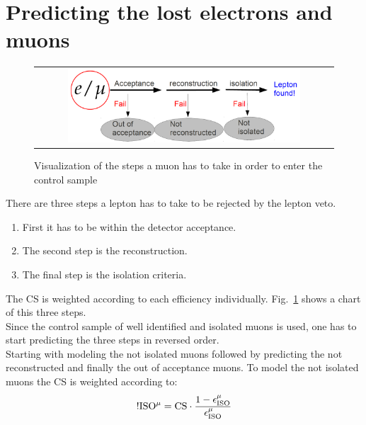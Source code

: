 \section{Predicting the lost electrons and muons}
\label{sec:ll_prediction}
\begin{figure}[tbhn]
\begin{center}
\begin{tabular}{c}
\includegraphics[width=0.80\textwidth]{lostlepton/plots/lepton_veto_sketch.png}\\
\end{tabular}
\end{center}
\caption{Visualization of the steps a muon has to take in order to enter the control sample}
\label{fig:sketch_lepton_veto}
\end{figure}
There are three steps a lepton has to take to be rejected by the lepton veto.
\begin{enumerate}

 \item First it has to be within the detector acceptance. 
 \item The second step is the reconstruction. 
 \item The final step is the isolation criteria.
\end{enumerate}
The CS is weighted according to each efficiency individually. 
Fig.~\ref{fig:sketch_lepton_veto} shows a chart of this three steps.\\
Since the control sample of well identified and isolated muons is used, one has to start predicting the three steps in reversed order.\\
Starting with modeling the not isolated muons followed by predicting the not reconstructed and finally the out of acceptance muons.
To model the not isolated muons the CS is weighted according to:
\begin{equation}
 \rm !ISO^{\mu} = {\rm CS}\cdot \frac{1-\epsilon_{\rm ISO}^{\mu}}{\epsilon_{\rm ISO}^{\mu}} 
\label{eq:isolation_muon}
\end{equation}
